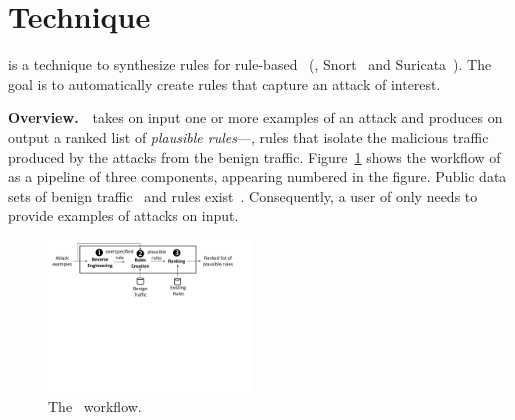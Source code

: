 \documentclass[sigconf,review, anonymous]{acmart}
\begin{document}
\section{Technique}
\label{sec:technique}

\tname{} is a technique to synthesize rules for rule-based
\nids~(\eg{}, Snort~\cite{snort} and Suricata~\cite{suricata}). The
goal is to automatically create rules that capture an attack of
interest.

\vspace{1ex}
\noindent\textbf{Overview.}~\tname\ takes on input one or more
examples of an attack and produces on output a ranked list of
\emph{plausible rules}---\ie{}, rules that isolate the malicious
traffic produced by the attacks from the benign
traffic. Figure~\ref{fig:overview} shows the workflow of \tname{} as a
pipeline of three components, appearing numbered in the figure.
Public data sets of benign
traffic~\cite{tcpreplay,stratosphere-normal} and rules
exist~\cite{emerging-threats-open}. Consequently, a user of \tname{}
only needs to provide examples of attacks on input.


\begin{figure}[t!]
  \centering
  \includegraphics[trim=0 340 50 0,clip,width=0.48\textwidth]{figs/nids-workflow}
  \vspace{-4ex}  
  \caption{The \tname\ workflow.}
  \label{fig:overview}
  \vspace{-3ex}
\end{figure}
\end{document}
